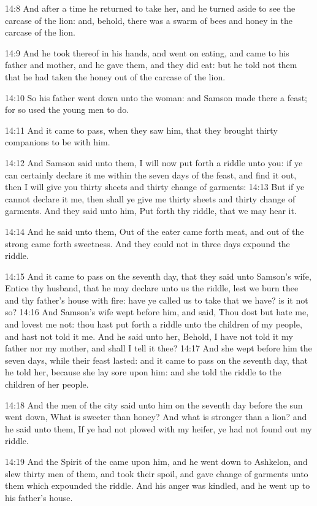 14:8 And after a time he returned to take her, and he turned aside to see the carcase of the lion: and, behold, there was a swarm of bees and honey in the carcase of the lion.

14:9 And he took thereof in his hands, and went on eating, and came to his father and mother, and he gave them, and they did eat: but he told not them that he had taken the honey out of the carcase of the lion.

14:10 So his father went down unto the woman: and Samson made there a feast; for so used the young men to do.

14:11 And it came to pass, when they saw him, that they brought thirty companions to be with him.

14:12 And Samson said unto them, I will now put forth a riddle unto you: if ye can certainly declare it me within the seven days of the feast, and find it out, then I will give you thirty sheets and thirty change of garments: 14:13 But if ye cannot declare it me, then shall ye give me thirty sheets and thirty change of garments. And they said unto him, Put forth thy riddle, that we may hear it.

14:14 And he said unto them, Out of the eater came forth meat, and out of the strong came forth sweetness. And they could not in three days expound the riddle.

14:15 And it came to pass on the seventh day, that they said unto Samson's wife, Entice thy husband, that he may declare unto us the riddle, lest we burn thee and thy father's house with fire: have ye called us to take that we have? is it not so?  14:16 And Samson's wife wept before him, and said, Thou dost but hate me, and lovest me not: thou hast put forth a riddle unto the children of my people, and hast not told it me. And he said unto her, Behold, I have not told it my father nor my mother, and shall I tell it thee?  14:17 And she wept before him the seven days, while their feast lasted: and it came to pass on the seventh day, that he told her, because she lay sore upon him: and she told the riddle to the children of her people.

14:18 And the men of the city said unto him on the seventh day before the sun went down, What is sweeter than honey? And what is stronger than a lion?  and he said unto them, If ye had not plowed with my heifer, ye had not found out my riddle.

14:19 And the Spirit of the \LORD came upon him, and he went down to Ashkelon, and slew thirty men of them, and took their spoil, and gave change of garments unto them which expounded the riddle. And his anger was kindled, and he went up to his father's house.

